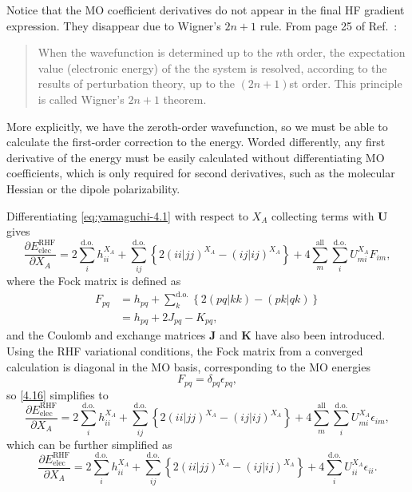 \documentclass[%
class = book,%
crop = false,%
float = true,%
multi = true,%
preview = false,%
]{standalone}
\let\cite\autocite
\begin{document}
Notice that the MO coefficient derivatives do not appear in the final HF gradient expression. They disappear due to Wigner's \(2n + 1\) rule. From page 25 of Ref.~\parencite{Yamaguchi1994}:
\begin{quote}
  When the wavefunction is determined up to the \(n\)th order, the expectation value (electronic energy) of the the system is resolved, according to the results of perturbation theory, up to the \((2n+1)\)st order. This principle is called Wigner's \(2n+1\) theorem\cite{doi:10.1063/1.1668053,EPSTEIN1980311}.
\end{quote}
More explicitly, we have the zeroth-order wavefunction, so we must be able to calculate the first-order correction to the energy. Worded differently, any first derivative of the energy must be easily calculated without differentiating MO coefficients, which is only required for second derivatives, such as the molecular Hessian or the dipole polarizability.

Differentiating \eqref{eq:yamaguchi-4.1} with respect to \(X_{A}\) collecting terms with \(\mathbf{U}\) gives
\begin{equation}
  \label{4.16}\tag{Yamaguchi eq. 4.16}
  \frac{\partial E_{\text{elec}}^{\text{RHF}}}{\partial X_{A}} = 2 \sum_{i}^{\text{d.o.}} h_{ii}^{X_{A}} + \sum_{ij}^{\text{d.o.}} \left\{ 2(ii|jj)^{X_{A}} - (ij|ij)^{X_{A}} \right\} + 4 \sum_{m}^{\text{all}} \sum_{i}^{\text{d.o.}} U_{mi}^{X_{A}} F_{im},
\end{equation}
where the Fock matrix is defined as
\begin{equation}
  \label{eq:yamaguchi-4.6} \tag{Yamaguchi eq. 4.6}
  \begin{aligned}
    F_{pq} &= h_{pq} + \sum_{k}^{\text{d.o.}} \left\{ 2(pq|kk) - (pk|qk) \right\} \\
    &= h_{pq} + 2J_{pq} - K_{pq},
  \end{aligned}
\end{equation}
and the Coulomb and exchange matrices \(\mathbf{J}\) and \(\mathbf{K}\) have also been introduced. Using the RHF variational conditions, the Fock matrix from a converged calculation is diagonal in the MO basis, corresponding to the MO energies
\begin{equation}
  F_{pq} = \delta_{pq} \epsilon_{pq}, \tag{Yamaguchi eq. 4.7}
\end{equation}
so \eqref{4.16} simplifies to
\begin{equation}
  \frac{\partial E_{\text{elec}}^{\text{RHF}}}{\partial X_{A}} = 2 \sum_{i}^{\text{d.o.}} h_{ii}^{X_{A}} + \sum_{ij}^{\text{d.o.}} \left\{ 2(ii|jj)^{X_{A}} - (ij|ij)^{X_{A}} \right\} + 4 \sum_{m}^{\text{all}} \sum_{i}^{\text{d.o.}} U_{mi}^{X_{A}} \epsilon_{im}, \tag{Yamaguchi eq. 4.17 modified}
\end{equation}
which can be further simplified as
\begin{equation}
  \frac{\partial E_{\text{elec}}^{\text{RHF}}}{\partial X_{A}} = 2 \sum_{i}^{\text{d.o.}} h_{ii}^{X_{A}} + \sum_{ij}^{\text{d.o.}} \left\{ 2(ii|jj)^{X_{A}} - (ij|ij)^{X_{A}} \right\} + 4 \sum_{i}^{\text{d.o.}} U_{ii}^{X_{A}} \epsilon_{ii}. \tag{Yamaguchi eq. 4.17}
\end{equation}
\end{document}
